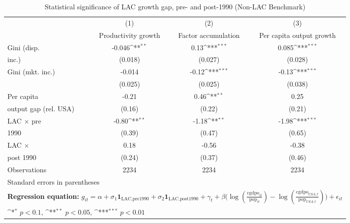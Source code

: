 \begin{table}[htbp]\centering
\def\sym#1{\ifmmode^{#1}\else\(^{#1}\)\fi}
\caption{Statistical significance of LAC growth gap, pre- and post-1990 (Non-LAC Benchmark)}
\begin{tabular}{l*{3}{c}}
\toprule
                &\multicolumn{1}{c}{(1)}&\multicolumn{1}{c}{(2)}&\multicolumn{1}{c}{(3)}\\
                &\multicolumn{1}{c}{Productivity growth}&\multicolumn{1}{c}{Factor accumulation}&\multicolumn{1}{c}{Per capita output growth}\\
\midrule
Gini (disp.     &   -0.046\sym{**} &     0.13\sym{***}&    0.085\sym{***}\\
inc.)           &  (0.018)         &  (0.027)         &  (0.028)         \\
\addlinespace
Gini (mkt. inc.)&   -0.014         &    -0.12\sym{***}&    -0.13\sym{***}\\
                &  (0.025)         &  (0.025)         &  (0.038)         \\
\addlinespace
Per capita      &    -0.21         &     0.46\sym{**} &     0.25         \\
output gap (rel. USA)&   (0.16)         &   (0.22)         &   (0.21)         \\
\addlinespace
LAC $\times$ pre&    -0.80\sym{**} &    -1.18\sym{**} &    -1.98\sym{***}\\
1990            &   (0.39)         &   (0.47)         &   (0.65)         \\
\addlinespace
LAC $\times$    &     0.18         &    -0.56         &    -0.38         \\
post 1990       &   (0.24)         &   (0.37)         &   (0.46)         \\
\midrule
Observations    &     2234         &     2234         &     2234         \\
\bottomrule
\multicolumn{4}{l}{\footnotesize Standard errors in parentheses}\\
\multicolumn{4}{l}{\footnotesize \textbf{Regression equation:} \(g_{it} = \alpha + \sigma_1 \mathbf{1}_{\textrm{LAC,pre1990}} + \sigma_2 \mathbf{1}_{\textrm{LAC,post1990}} + \gamma_t + \beta \big(\log (\frac{\textrm{cgdpo}_{it}}{\textrm{pop}_{it}} ) - \log (\frac{\textrm{cgdpo}_{USA,t}}{\textrm{pop}_{USA,t}}  ) \big) + \epsilon_{it}\)}\\
\multicolumn{4}{l}{\footnotesize \sym{*} \(p<0.1\), \sym{**} \(p<0.05\), \sym{***} \(p<0.01\)}\\
\end{tabular}
\end{table}
